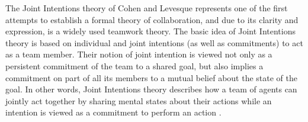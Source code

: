 \documentclass[a4paper, 11pt]{article}
\begin{document}
\begin{small}
The Joint Intentions theory of Cohen and Levesque \cite{cohen:teamwork,
cohen:intention-commitment, cohen:persistence-intention-commitment,
cohen:intentions, levesque:acting-together} represents one of the first attempts
to establish a formal theory of collaboration, and due to its clarity and
expression, is a widely used teamwork theory. The basic idea of Joint Intentions
theory is based on individual and joint intentions (as well as commitments) to
act as a team member. Their notion of joint intention is viewed not only as a
persistent commitment of the team to a shared goal, but also implies a
commitment on part of all its members to a mutual belief about the state of the
goal. In other words, Joint Intentions theory describes how a team of agents can
jointly act together by sharing mental states about their actions while an
intention is viewed as a commitment to perform an action 
\cite{cohen:intention-commitment}.




\end{small}
\end{document}
